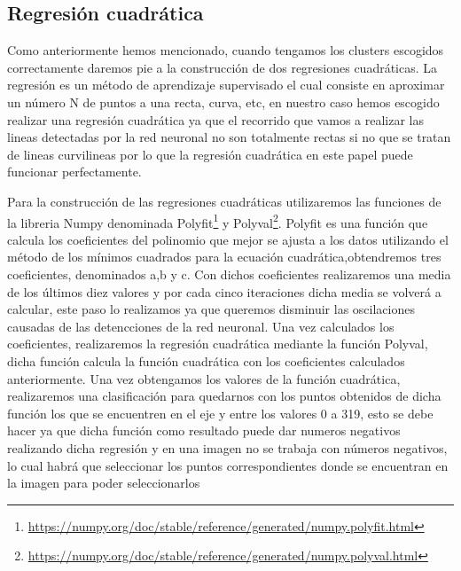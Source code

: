 \subsection{Regresión cuadrática}
\label{sec:Regresión cuadrática}
Como anteriormente hemos mencionado, cuando tengamos los clusters escogidos correctamente daremos pie a la construcción de dos regresiones cuadráticas. \newline 
\newline 
La regresión es un método de aprendizaje supervisado el cual consiste en aproximar un número N de puntos a una recta, curva, etc, en nuestro caso hemos escogido realizar una regresión cuadrática ya que el recorrido
que vamos a realizar las lineas detectadas por la red neuronal no son totalmente rectas si no que se tratan de lineas curvilineas por lo que la regresión cuadrática en este papel puede 
funcionar perfectamente. \newline

Para la construcción de las regresiones cuadráticas utilizaremos las funciones de la libreria Numpy denominada Polyfit\footnote{\url{https://numpy.org/doc/stable/reference/generated/numpy.polyfit.html}}
y Polyval\footnote{\url{ https://numpy.org/doc/stable/reference/generated/numpy.polyval.html}}. 
Polyfit es una función que calcula los  coeficientes del polinomio que mejor se ajusta a los datos utilizando el método de los mínimos 
cuadrados para la ecuación cuadrática,obtendremos tres coeficientes, denominados a,b y c. \newline
\newline
Con dichos coeficientes realizaremos una media de los últimos diez valores y por cada cinco iteraciones dicha media se volverá a calcular, este paso lo realizamos ya que 
queremos disminuir las oscilaciones causadas de las detencciones de la red neuronal. Una vez calculados los coeficientes, realizaremos la regresión cuadrática mediante la función Polyval, dicha función calcula
la función cuadrática con los coeficientes calculados anteriormente. \newline 
Una vez obtengamos los valores de la función cuadrática, realizaremos una clasificación para quedarnos con los puntos obtenidos
de dicha función los que se encuentren en el eje y entre los valores 0 a 319, esto se debe hacer ya que dicha función como resultado puede dar numeros negativos realizando dicha regresión y en una 
imagen no se trabaja con números negativos, lo cual habrá que seleccionar los puntos correspondientes donde se encuentran en la imagen para poder seleccionarlos \newline

